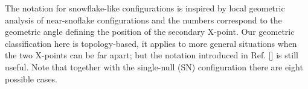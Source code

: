 The notation for snowflake-like configurations is inspired by local
geometric analysis of near-snoflake configurations and the numbers
correspond to the geometric angle defining the position of the
secondary X-point. Our geometric classification here is
topology-based, it applies to more general situations when the two
X-points can be far apart; but the notation introduced in Ref. [] is
still useful. Note that together with the single-null (SN)
configuration there are eight possible cases.
